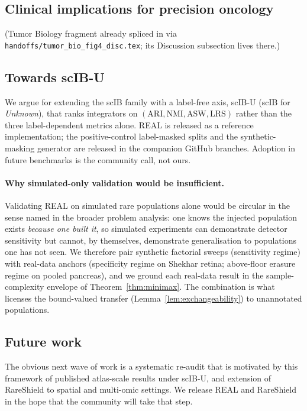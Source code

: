 



\subsection{Clinical implications for precision oncology}

(Tumor Biology fragment already spliced in  via \texttt{handoffs/tumor\_bio\_fig4\_disc.tex}; its Discussion subsection lives there.)

\subsection{Towards scIB-U}

We argue for extending the scIB family with a label-free axis, scIB-U (scIB for \emph{Unknown}), that ranks integrators on $(\mathrm{ARI}, \mathrm{NMI}, \mathrm{ASW}, \mathrm{LRS})$ rather than the three label-dependent metrics alone.  REAL is released as a reference implementation; the positive-control label-masked splits and the synthetic-masking generator are released in the companion GitHub branches.  Adoption in future benchmarks is the community call, not ours.













\paragraph{Why simulated-only validation would be insufficient.}  Validating REAL on simulated rare populations alone would be circular in the sense named in the broader problem analysis: one knows the injected population exists \emph{because one built it}, so simulated experiments can demonstrate detector sensitivity but cannot, by themselves, demonstrate generalisation to populations one has not seen.  We therefore pair synthetic factorial sweeps (sensitivity regime) with real-data anchors (specificity regime on Shekhar retina; above-floor erasure regime on pooled pancreas), and we ground each real-data result in the sample-complexity envelope of Theorem~\ref{thm:minimax}.  The combination is what licenses the bound-valued transfer (Lemma~\ref{lem:exchangeability}) to unannotated populations.

\subsection{Future work}

The obvious next wave of work is a systematic re-audit that is motivated by this framework of published atlas-scale results under scIB-U, and extension of RareShield to spatial and multi-omic settings.  We release REAL and RareShield in the hope that the community will take that step.
